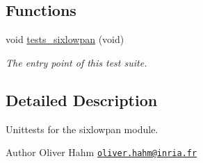 \subsection*{Functions}
\begin{DoxyCompactItemize}
\item 
void \hyperlink{group__unittests_gab1ea4d232c2abb95e5705f20432f3e07}{tests\+\_\+sixlowpan} (void)
\begin{DoxyCompactList}\small\item\em The entry point of this test suite. \end{DoxyCompactList}\end{DoxyCompactItemize}


\subsection{Detailed Description}
Unittests for the {\ttfamily sixlowpan} module. 

\begin{DoxyAuthor}{Author}
Oliver Hahm \href{mailto:oliver.hahm@inria.fr}{\tt oliver.\+hahm@inria.\+fr} 
\end{DoxyAuthor}

